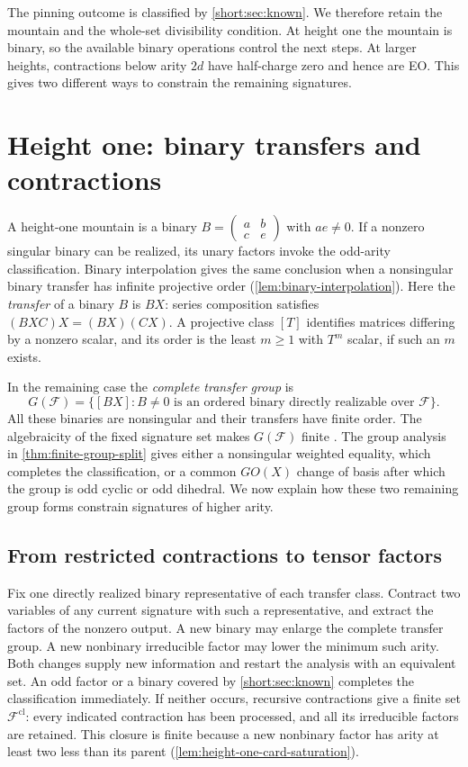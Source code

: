 \documentclass[11pt,letterpaper,onecolumn]{article}
\theoremstyle{plain}
\theoremstyle{definition}
\theoremstyle{remark}
\newcommand{\cF}{\mathcal F}
\begin{document}
The pinning outcome is classified by \cref{short:sec:known}. We therefore
retain the mountain and the whole-set divisibility condition.
At height one the mountain is binary, so the available binary operations
control the next steps. At larger heights, contractions below arity
\(2d\) have half-charge zero and hence are EO. This gives two different
ways to constrain the remaining signatures.

\section{Height one: binary transfers and contractions}
\label{short:sec:height-one}

A height-one mountain is a binary
\(B=\left(\begin{smallmatrix}a&b\\c&e\end{smallmatrix}\right)\) with
\(ae\ne0\). If a nonzero singular binary can be realized, its unary
factors invoke the odd-arity classification. Binary interpolation gives
the same conclusion when a nonsingular binary transfer has infinite
projective order (\cref{lem:binary-interpolation}).
Here the \emph{transfer} of a binary \(B\) is \(BX\): series composition
satisfies \((BXC)X=(BX)(CX)\). A projective class \([T]\) identifies
matrices differing by a nonzero scalar, and its order is the least
\(m\ge1\) with \(T^m\) scalar, if such an \(m\) exists.

In the remaining case the \emph{complete transfer group} is
\[
G(\cF)=\{[BX]: B\ne0\text{ is an ordered binary directly realizable over }\cF\}.
\]
All these binaries are nonsingular and their transfers have finite order.
The algebraicity of the fixed signature set makes \(G(\cF)\) finite
\cite[Lemma~5.2]{Liu2026DEQ2Holant}. The group analysis in \cref{thm:finite-group-split} gives either a nonsingular
weighted equality, which completes the classification, or a common
\(GO(X)\) change of basis after which the group is odd cyclic or odd
dihedral. We now explain how these two remaining group forms constrain
signatures of higher arity.

\subsection{From restricted contractions to tensor factors}

Fix one directly realized binary representative of each transfer class.
Contract two variables of any current signature with such a
representative, and extract the factors of the nonzero output. A new
binary may enlarge the complete transfer group. A new nonbinary
irreducible factor may lower the minimum such arity. Both changes supply
new information and restart the analysis with an equivalent set.
An odd factor or a binary covered by \cref{short:sec:known} completes
the classification immediately.
If neither occurs, recursive contractions give a finite set
\(\cF^{\mathrm{cl}}\): every indicated contraction has been processed,
and all its irreducible factors are retained. This closure is finite
because a new nonbinary factor has arity at least two less than its
parent (\cref{lem:height-one-card-saturation}).
\end{document}

